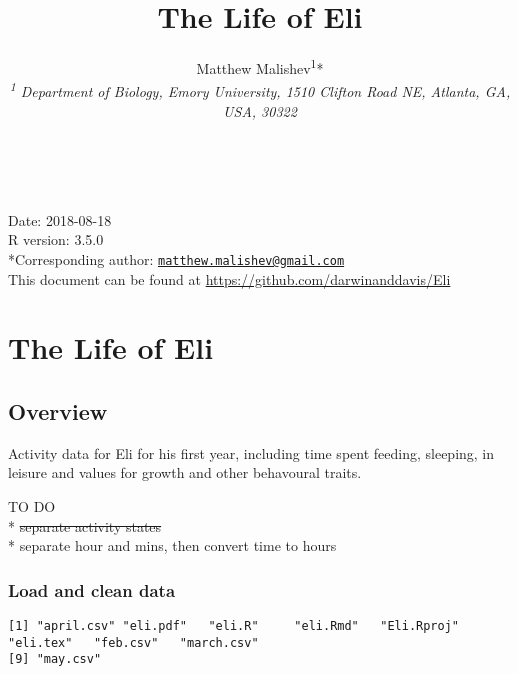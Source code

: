 \documentclass[10,portrait]{article}
\title{The Life of Eli}
\author{Matthew Malishev\textsuperscript{1}*\\
\emph{\textsuperscript{1} Department of Biology, Emory University, 1510
Clifton Road NE, Atlanta, GA, USA, 30322}}
\date{}
\newenvironment{Shaded}{\begin{snugshade}}{\end{snugshade}}
\newcommand{\KeywordTok}[1]{\textcolor[rgb]{0.13,0.29,0.53}{\textbf{#1}}}
\newcommand{\CommentTok}[1]{\textcolor[rgb]{0.56,0.35,0.01}{\textit{#1}}}
\newcommand{\OperatorTok}[1]{\textcolor[rgb]{0.81,0.36,0.00}{\textbf{#1}}}
\newcommand{\NormalTok}[1]{#1}
\begin{document}
\maketitle

{
\hypersetup{linkcolor=black}
\setcounter{tocdepth}{3}
\tableofcontents
}
~

Date: 2018-08-18\\
R version: 3.5.0\\
*Corresponding author:
\href{mailto:matthew.malishev@gmail.com}{\nolinkurl{matthew.malishev@gmail.com}}\\
This document can be found at
\url{https://github.com/darwinanddavis/Eli}

\newpage  

\section{The Life of Eli}\label{the-life-of-eli}

\subsection{Overview}\label{overview}

Activity data for Eli for his first year, including time spent feeding,
sleeping, in leisure and values for growth and other behavoural traits.

TO DO\\
* \sout{separate activity states}\\
* separate hour and mins, then convert time to hours

\subsubsection{Load and clean data}\label{load-and-clean-data}

\begin{Shaded}
\end{Shaded}

\begin{verbatim}
[1] "april.csv" "eli.pdf"   "eli.R"     "eli.Rmd"   "Eli.Rproj" "eli.tex"   "feb.csv"   "march.csv"
[9] "may.csv"  
\end{verbatim}
\end{document}
